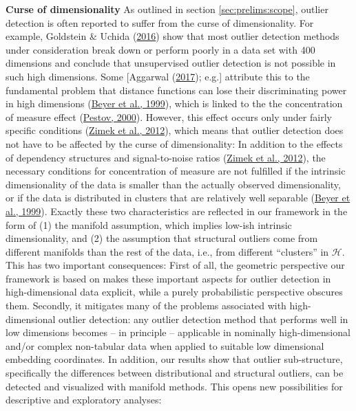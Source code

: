 \documentclass[
  10pt]{article}
\newcommand{\hdspace}{\mathcal{H}}
\begin{document}
\textbf{Curse of dimensionality} As outlined in section \ref{sec:prelims:scope}, outlier detection is often reported to suffer from the curse of dimensionality. For example, Goldstein \& Uchida (\protect\hyperlink{ref-goldstein2016comparative}{2016}) show that most outlier detection methods under consideration break down or perform poorly in a data set with 400 dimensions and conclude that unsupervised outlier detection is not possible in such high dimensions. Some {[}Aggarwal (\protect\hyperlink{ref-aggarwal2017outlier}{2017}); e.g.{]} attribute this to the fundamental problem that distance functions can lose their discriminating power in high dimensions (\protect\hyperlink{ref-beyer1999nearest}{Beyer et al., 1999}), which is linked to the the concentration of measure effect (\protect\hyperlink{ref-pestov2000geometry}{Pestov, 2000}). However, this effect occurs only under fairly specific conditions (\protect\hyperlink{ref-zimek2012survey}{Zimek et al., 2012}), which means that outlier detection does not have to be affected by the curse of dimensionality: In addition to the effects of dependency structures and signal-to-noise ratios (\protect\hyperlink{ref-zimek2012survey}{Zimek et al., 2012}), the necessary conditions for concentration of measure are not fulfilled if the intrinsic dimensionality of the data is smaller than the actually observed dimensionality, or if the data is distributed in clusters that are relatively well separable (\protect\hyperlink{ref-beyer1999nearest}{Beyer et al., 1999}). Exactly these two characteristics are reflected in our framework in the form of (1) the manifold assumption, which implies low-ish intrinsic dimensionality, and (2) the assumption that structural outliers come from different manifolds than the rest of the data, i.e., from different ``clusters'' in \(\hdspace\). This has two important consequences: First of all, the geometric perspective our framework is based on makes these important aspects for outlier detection in high-dimensional data explicit, while a purely probabilistic perspective obscures them. Secondly, it mitigates many of the problems associated with high-dimensional outlier detection: any outlier detection method that performs well in low dimensions becomes -- in principle -- applicable in nominally high-dimensional and/or complex non-tabular data when applied to suitable low dimensional embedding coordinates.
In addition, our results show that outlier sub-structure, specifically the differences between distributional and structural outliers, can be detected and visualized with manifold methods. This opens new possibilities for descriptive and exploratory analyses:\\
\end{document}
